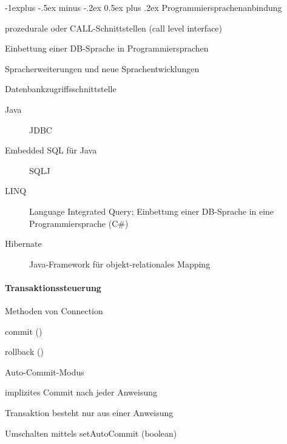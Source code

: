 \documentclass[a4paper]{article}
\makeatletter
\renewcommand{\subsection}{\@startsection{subsection}{2}{0mm}%
                                {-1explus -.5ex minus -.2ex}%
                                {0.5ex plus .2ex}%
                                {\normalfont\normalsize\bfseries}}
\makeatother
\begin{document}
\begin{multicols}{3}
    \subsection{Programmiersprachenanbindung}
    \begin{itemize*}
        \item prozedurale oder CALL-Schnittstellen (call level interface)
        \item Einbettung einer DB-Sprache in Programmiersprachen
        \item Spracherweiterungen und neue Sprachentwicklungen
    \end{itemize*}

    Datenbankzugriffsschnittstelle
    \begin{description}
        \item[Java] JDBC
        \item[Embedded SQL für Java] SQLJ
        \item[LINQ] Language Integrated Query; Einbettung einer DB-Sprache in eine Programmiersprache (C\#)
        \item[Hibernate] Java-Framework für objekt-relationales Mapping
    \end{description}

    \paragraph{Transaktionssteuerung}
    \begin{itemize*}
        \item Methoden von Connection
        \begin{itemize*}
            \item commit ()
            \item rollback ()
        \end{itemize*}
        \item Auto-Commit-Modus
        \begin{itemize*}
            \item implizites Commit nach jeder Anweisung
            \item Transaktion besteht nur aus einer Anweisung
            \item Umschalten mittels setAutoCommit (boolean)
        \end{itemize*}
    \end{itemize*}



\end{multicols}
\end{document}
